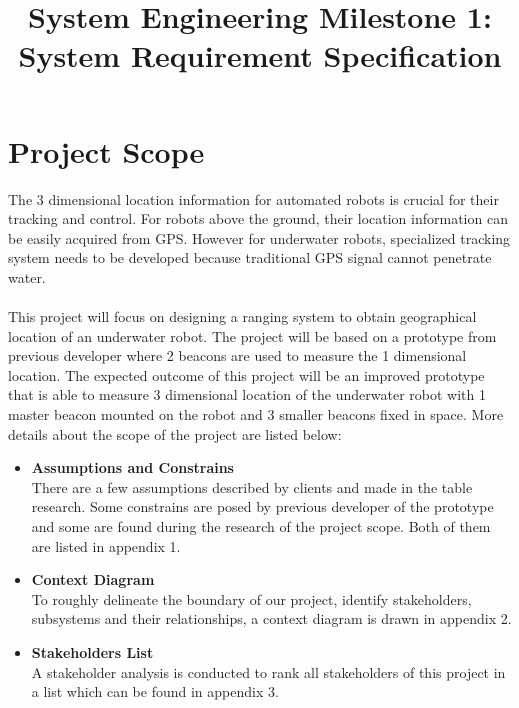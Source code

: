 \documentclass{article}
\date{}
\begin{document}
\title{\vspace{-1cm}System Engineering Milestone 1: System Requirement Specification}
\maketitle
\section{Project Scope}
The 3 dimensional location information for automated robots is crucial for their tracking and control. For robots above the ground, their location information can be easily acquired from GPS. However for underwater robots, specialized tracking system needs to be developed because traditional GPS signal cannot penetrate water.\\\\
This project will focus on designing a ranging system to obtain geographical location of an underwater robot. The project will be based on a prototype from previous developer where 2 beacons are used to measure the 1 dimensional location. The expected outcome of this project will be an improved prototype that is able to measure 3 dimensional location of the underwater robot with 1 master beacon mounted on the robot and 3 smaller beacons fixed in space.  More details about the scope of the project are listed below:
\begin{itemize}
\item \textbf{Assumptions and Constrains}\\
There are a few assumptions described by clients and made in the table research. Some constrains are posed by previous developer of the prototype and some are found during the research of the project scope. Both of them are listed in appendix 1.
\item \textbf{Context Diagram}\\
To roughly delineate the boundary of our project, identify stakeholders, subsystems and their relationships, a context diagram is drawn in appendix 2.
\item \textbf{Stakeholders List}\\
A stakeholder analysis is conducted to rank all stakeholders of this project in a list which can be found in appendix 3.

\end{itemize}
\end{document}
